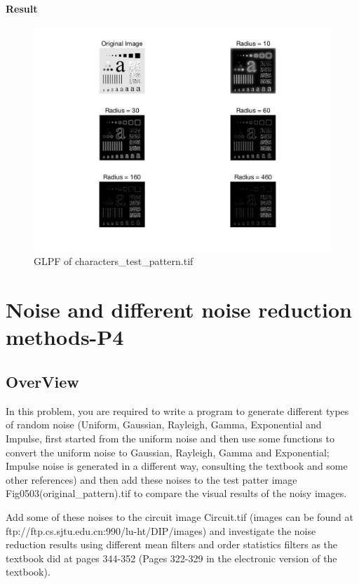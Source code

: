\documentclass[11pt,oneside]{book}
\begin{document}
\subsubsection{Result}
\begin{figure}[!htb]
   \centering  
   \includegraphics[width=1.0\textwidth]{images/3/GHPF.jpg}
   \caption{GLPF of characters\_test\_pattern.tif}  
\end{figure}




\chapter{Noise and different noise reduction methods-P4}
\section{OverView}
In this problem, you are required to write a program to generate different types of random noise (Uniform, Gaussian, Rayleigh, Gamma, Exponential and Impulse, first started from the uniform noise and then use some functions to convert the uniform noise to Gaussian, Rayleigh, Gamma and Exponential; Impulse noise is generated in a different way, consulting the textbook and some other references) and then add these noises to the test patter image Fig0503(original\_pattern).tif to compare the visual results of the noisy images.

Add some of these noises to the circuit image Circuit.tif (images can be found at ftp://ftp.cs.sjtu.edu.cn:990/lu-ht/DIP/images) and investigate the noise reduction results using different mean filters and order statistics filters as the textbook did at pages 344-352 (Pages 322-329 in the electronic version of the textbook).
\end{document}
